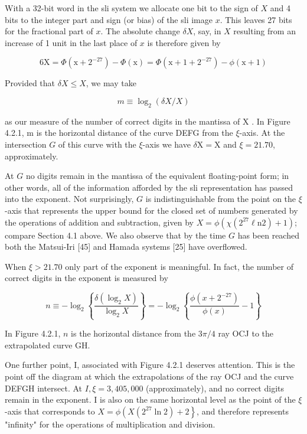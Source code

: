 \documentclass[10pt]{article}
\begin{document}
With a 32-bit word in the sli system we allocate one bit to the sign of $X$ and 4 bits to the integer part and sign (or bias) of the sli image $x$. This leaves 27 bits for the fractional part of $x$. The absolute change $\delta X$, say, in $X$ resulting from an increase of 1 unit in the last place of $x$ is therefore given by

$$
6 \mathrm{X}=\Phi\left(\mathrm{x}+2^{-27}\right)-\Phi(\mathrm{x})=\Phi\left(\mathrm{x}+1+2^{-27}\right)-\phi(\mathrm{x}+1)
$$

Provided that $\delta X \leqslant X$, we may take

$$
m \equiv \log _{2}(\delta X / X)
$$

as our measure of the number of correct digits in the mantissa of X . In Figure 4.2.1, m is the horizontal distance of the curve DEFG from the $\xi$-axis. At the intersection $G$ of this curve with the $\xi$-axis we have $\delta \mathrm{X}=\mathrm{X}$ and $\xi=21.70$, approximately.

At $G$ no digits remain in the mantissa of the equivalent floating-point form; in other words, all of the information afforded by the sli representation has passed into the exponent. Not surprisingly, $G$ is indistinguishable from the point on the $\xi$-axis that represents the upper bound for the closed set of numbers generated by the operations of addition and subtraction, given by $X=\phi\left(\chi\left(2^{27} \ell \mathrm{n} 2\right)+1\right)$; compare Section 4.1 above. We also observe that by the time $G$ has been reached both the Matsui-Iri [45] and Hamada systems [25] have overflowed.

When $\xi>21.70$ only part of the exponent is meaningful. In fact, the number of correct digits in the exponent is measured by

$$
n \equiv-\log _{2}\left\{\frac{\delta\left(\log _{2} X\right)}{\log _{2} X}\right\}=-\log _{2}\left\{\frac{\phi\left(x+2^{-27}\right)}{\phi(x)}-1\right\}
$$

In Figure 4.2.1, $n$ is the horizontal distance from the $3 \pi / 4$ ray OCJ to the extrapolated curve GH.

One further point, I, associated with Figure 4.2.1 deserves attention. This is the point off the diagram at which the extrapolations of the ray OCJ and the curve DEFGH intersect. At $I, \xi=3,405,000$ (approximately), and no correct digits remain in the exponent. I is also on the same horizontal level as the point of the $\xi$-axis that corresponds to $X=\phi\left(X\left(2^{27} \ln 2\right)+2\right\}$, and therefore represents "infinity" for the operations of multiplication and division.
\end{document}
